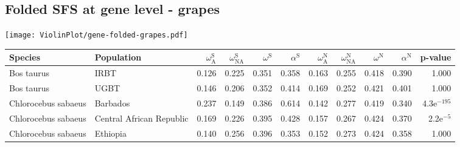 \subsection{Folded SFS at gene level - grapes} 
\begin{center}
\texttt{[image: ViolinPlot/gene-folded-grapes.pdf]} 
\begin{adjustbox}{width = 1\textwidth}
\begin{tabular}{llrrrrrrrrr}
\toprule
             Species &                Population & $\omega_{\textrm{A}}^{\textrm{S}}$ & $\omega_{\textrm{NA}}^{\textrm{S}}$ & $\omega^{\textrm{S}}$ & $\alpha^{\textrm{S}}$ & $\omega_{\textrm{A}}^{\textrm{N}}$ & $\omega_{\textrm{NA}}^{\textrm{N}}$ & $\omega^{\textrm{N}}$ & $\alpha^{\textrm{N}}$ &       p-value \\
\midrule
          Bos taurus &                      IRBT &                              0.126 &                               0.225 &                 0.351 &                 0.358 &                              0.163 &                               0.255 &                 0.418 &                 0.390 &         1.000 \\
          Bos taurus &                      UGBT &                              0.146 &                               0.206 &                 0.352 &                 0.414 &                              0.169 &                               0.252 &                 0.421 &                 0.401 &         1.000 \\
 Chlorocebus sabaeus &                  Barbados &                              0.237 &                               0.149 &                 0.386 &                 0.614 &                              0.142 &                               0.277 &                 0.419 &                 0.340 & 4.3e$^{-195}$ \\
 Chlorocebus sabaeus &  Central African Republic &                              0.169 &                               0.226 &                 0.395 &                 0.428 &                              0.157 &                               0.267 &                 0.424 &                 0.370 &   2.2e$^{-5}$ \\
 Chlorocebus sabaeus &                  Ethiopia &                              0.140 &                               0.256 &                 0.396 &                 0.353 &                              0.152 &                               0.273 &                 0.424 &                 0.358 &         1.000 \\

\end{tabular}
\end{adjustbox}
\end{center}

